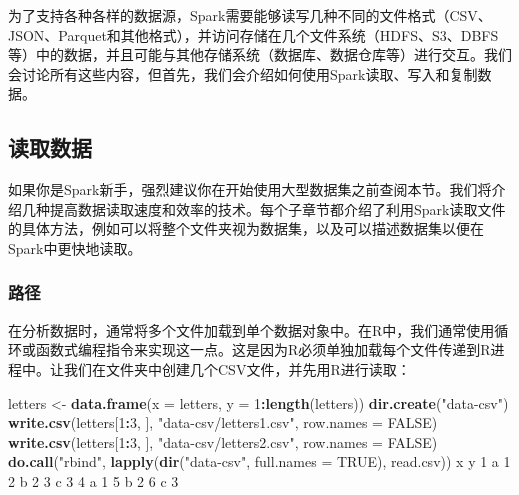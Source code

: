 \documentclass[
]{article}
\newenvironment{Shaded}{\begin{snugshade}}{\end{snugshade}}
\newcommand{\DataTypeTok}[1]{\textcolor[rgb]{0.13,0.29,0.53}{#1}}
\newcommand{\DecValTok}[1]{\textcolor[rgb]{0.00,0.00,0.81}{#1}}
\newcommand{\KeywordTok}[1]{\textcolor[rgb]{0.13,0.29,0.53}{\textbf{#1}}}
\newcommand{\NormalTok}[1]{#1}
\newcommand{\OperatorTok}[1]{\textcolor[rgb]{0.81,0.36,0.00}{\textbf{#1}}}
\newcommand{\OtherTok}[1]{\textcolor[rgb]{0.56,0.35,0.01}{#1}}
\newcommand{\StringTok}[1]{\textcolor[rgb]{0.31,0.60,0.02}{#1}}
\begin{document}
为了支持各种各样的数据源，Spark需要能够读写几种不同的文件格式（CSV、JSON、Parquet和其他格式），并访问存储在几个文件系统（HDFS、S3、DBFS等）中的数据，并且可能与其他存储系统（数据库、数据仓库等）进行交互。我们会讨论所有这些内容，但首先，我们会介绍如何使用Spark读取、写入和复制数据。

\hypertarget{ux8bfbux53d6ux6570ux636e}{%
\subsection{读取数据}\label{ux8bfbux53d6ux6570ux636e}}

如果你是Spark新手，强烈建议你在开始使用大型数据集之前查阅本节。我们将介绍几种提高数据读取速度和效率的技术。每个子章节都介绍了利用Spark读取文件的具体方法，例如可以将整个文件夹视为数据集，以及可以描述数据集以便在Spark中更快地读取。

\hypertarget{ux8defux5f84}{%
\subsubsection{路径}\label{ux8defux5f84}}

在分析数据时，通常将多个文件加载到单个数据对象中。在R中，我们通常使用循环或函数式编程指令来实现这一点。这是因为R必须单独加载每个文件传递到R进程中。让我们在文件夹中创建几个CSV文件，并先用R进行读取：

\begin{Shaded}
\begin{Highlighting}[]
\NormalTok{letters <-}\StringTok{ }\KeywordTok{data.frame}\NormalTok{(}\DataTypeTok{x =}\NormalTok{ letters, }\DataTypeTok{y =} \DecValTok{1}\OperatorTok{:}\KeywordTok{length}\NormalTok{(letters))}
\KeywordTok{dir.create}\NormalTok{(}\StringTok{"data-csv"}\NormalTok{)}
\KeywordTok{write.csv}\NormalTok{(letters[}\DecValTok{1}\OperatorTok{:}\DecValTok{3}\NormalTok{, ], }\StringTok{"data-csv/letters1.csv"}\NormalTok{, }\DataTypeTok{row.names =} \OtherTok{FALSE}\NormalTok{)}
\KeywordTok{write.csv}\NormalTok{(letters[}\DecValTok{1}\OperatorTok{:}\DecValTok{3}\NormalTok{, ], }\StringTok{"data-csv/letters2.csv"}\NormalTok{, }\DataTypeTok{row.names =} \OtherTok{FALSE}\NormalTok{)}
\KeywordTok{do.call}\NormalTok{(}\StringTok{"rbind"}\NormalTok{, }\KeywordTok{lapply}\NormalTok{(}\KeywordTok{dir}\NormalTok{(}\StringTok{"data-csv"}\NormalTok{, }\DataTypeTok{full.names =} \OtherTok{TRUE}\NormalTok{), read.csv))}
\NormalTok{ x y}
\DecValTok{1}\NormalTok{ a }\DecValTok{1}
\DecValTok{2}\NormalTok{ b }\DecValTok{2}
\DecValTok{3}\NormalTok{ c }\DecValTok{3}
\DecValTok{4}\NormalTok{ a }\DecValTok{1}
\DecValTok{5}\NormalTok{ b }\DecValTok{2}
\DecValTok{6}\NormalTok{ c }\DecValTok{3}
\end{Highlighting}
\end{Shaded}
\end{document}
